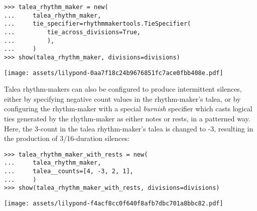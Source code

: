 \begin{comment}
<abjad>
talea_rhythm_maker = new(
    talea_rhythm_maker,
    tie_specifier=rhythmmakertools.TieSpecifier(
        tie_across_divisions=True,
        ),
    )
show(talea_rhythm_maker, divisions=divisions)
</abjad>
\end{comment}

\begin{abjadbookoutput}
\begin{singlespacing}
\vspace{-0.5\baselineskip}
\begin{verbatim}
>>> talea_rhythm_maker = new(
...     talea_rhythm_maker,
...     tie_specifier=rhythmmakertools.TieSpecifier(
...         tie_across_divisions=True,
...         ),
...     )
>>> show(talea_rhythm_maker, divisions=divisions)
\end{verbatim}
\noindent\texttt{[image: assets/lilypond-0aa7f18c24b9676851fc7ace0fbb408e.pdf]}
\end{singlespacing}
\end{abjadbookoutput}

\noindent Talea rhythm-makers can also be configured to produce intermittent
silences, either by specifying negative count values in the rhythm-maker's
talea, or by configuring the rhythm-maker with a special \emph{burnish}
specifier which casts logical ties generated by the rhythm-maker as either
notes or rests, in a patterned way. Here, the 3-count in the talea
rhythm-maker's talea is changed to -3, resulting in the production of
3/16-duration silences:

\begin{comment}
<abjad>
talea_rhythm_maker_with_rests = new(
    talea_rhythm_maker,
    talea__counts=[4, -3, 2, 1],
    )
show(talea_rhythm_maker_with_rests, divisions=divisions)
</abjad>
\end{comment}

\begin{abjadbookoutput}
\begin{singlespacing}
\vspace{-0.5\baselineskip}
\begin{verbatim}
>>> talea_rhythm_maker_with_rests = new(
...     talea_rhythm_maker,
...     talea__counts=[4, -3, 2, 1],
...     )
>>> show(talea_rhythm_maker_with_rests, divisions=divisions)
\end{verbatim}
\noindent\texttt{[image: assets/lilypond-f4acf8cc0f640f8afb7dbc701a8bbc82.pdf]}
\end{singlespacing}
\end{abjadbookoutput}

